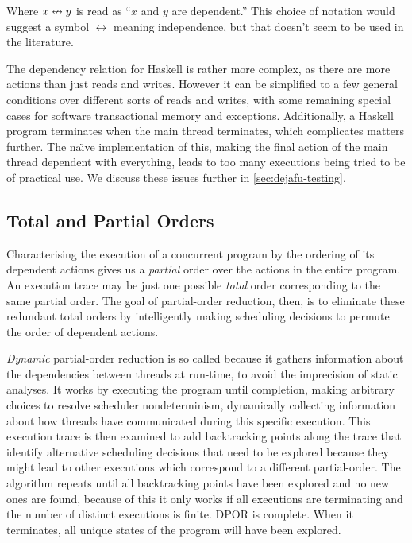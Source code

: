 Where $x \nleftrightarrow y$ is read as ``$x$ and $y$ are dependent.''  This
choice of notation would suggest a symbol $\leftrightarrow$ meaning
independence, but that doesn't seem to be used in the literature.

The dependency relation for Haskell is rather more complex, as there
are more actions than just reads and writes.  However it can be
simplified to a few general conditions over different sorts of reads
and writes, with some remaining special cases for software
transactional memory and exceptions.  Additionally, a Haskell program
terminates when the main thread terminates, which complicates matters
further.  The na\"{\i}ve implementation of this, making the final
action of the main thread dependent with everything, leads to too many
executions being tried to be of practical use.  We discuss these
issues further in \cref{sec:dejafu-testing}.

\subsection{Total and Partial Orders}

Characterising the execution of a concurrent program by the ordering of its
dependent actions gives us a \emph{partial} order over the actions in the entire
program.  An execution trace may be just one possible \emph{total} order
corresponding to the same partial order.  The goal of partial-order reduction,
then, is to eliminate these redundant total orders by intelligently making
scheduling decisions to permute the order of dependent actions.

\emph{Dynamic} partial-order reduction is so called because it gathers
information about the dependencies between threads at run-time, to
avoid the imprecision of static analyses\cite{flanagan2005}.  It works
by executing the program until completion, making arbitrary choices to
resolve scheduler nondeterminism, dynamically collecting information
about how threads have communicated during this specific execution.
This execution trace is then examined to add backtracking points along
the trace that identify alternative scheduling decisions that need to
be explored because they might lead to other executions which
correspond to a different partial-order.  The algorithm repeats until
all backtracking points have been explored and no new ones are found,
because of this it only works if all executions are terminating and
the number of distinct executions is finite.  DPOR is complete.  When
it terminates, all unique states of the program will have been
explored.


